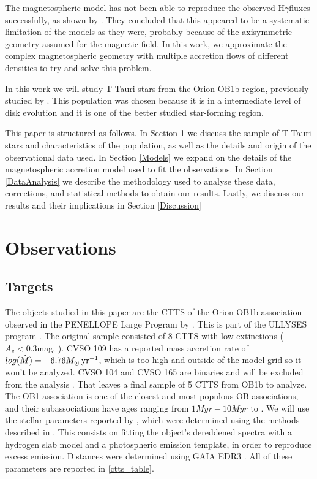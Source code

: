 \documentclass[twocolumn,linenumbers]{aastex631}
\newcommand{\hgamma}{H$\gamma$}
\newcommand{\msunyr}{M_{\sun} \, \rm{ yr^{-1}}}
\begin{document}


The magnetospheric model has not been able to reproduce the observed \hgamma fluxes successfully, as shown by \citet{micolta2023}. They concluded that this appeared to be a systematic limitation of the models as they were, probably because of the axisymmetric geometry assumed for the magnetic field. In this work, we approximate the complex magnetospheric geometry with multiple accretion flows of different densities to try and solve this problem.

In this work we will study T-Tauri stars from the Orion OB1b region, previously studied by \citet{manara2021}. This population was chosen because it is in a intermediate level of disk evolution and it is one of the better studied star-forming region. 

This paper is structured as follows. In Section \ref{Sample and observations} we discuss the sample of T-Tauri stars and characteristics of the population, as well as the details and origin of the observational data used. In Section \ref{Models} we expand on the details of the magnetospheric accretion model used to fit the observations. In Section \ref{DataAnalysis} we describe the methodology used to analyse these data, corrections, and statistical methods to obtain our results. Lastly, we discuss our results and their implications in Section \ref{Discussion}



\section{Observations} \label{Sample and observations}

\subsection{Targets}
The objects studied in this paper are the CTTS of the Orion OB1b association observed in the PENELLOPE Large Program by \citep{manara2021}. This is part of the ULLYSES program \citep{roman-duval2020}. The original sample consisted of 8 CTTS with low extinctions ($A_v < 0.3$mag, \citet{briceno2019}). CVSO 109 has a reported mass accretion rate of $log(\dot{M})= -6.76\msunyr$, which is too high and outside of the model grid so it won't be analyzed. CVSO 104 and CVSO 165 are binaries and will be excluded from the analysis \citep{manara2021a}.  That leaves a final sample of 5 CTTS from OB1b to analyze. The OB1 association is one of the closest and most populous OB associations, and their subassociations have ages ranging from $1Myr-10Myr$ to \citep{blaauw1994}.  We will use the stellar parameters reported by \citet{manara2021}, which were determined using the methods described in \citep{manara2013a}. This consists on fitting the object's dereddened spectra with a hydrogen slab model and a photospheric emission template, in order to reproduce excess emission. Distances were determined using GAIA EDR3 \citep{gaia2016,gaia2021}. All of these parameters are reported in \ref{ctts_table}. 
\end{document}
